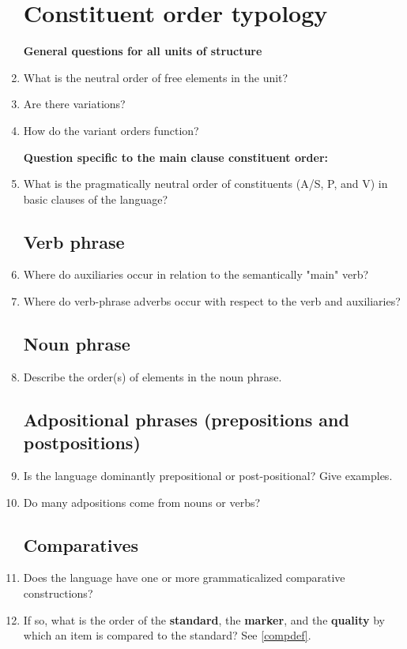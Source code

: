 \documentclass[twocolumn]{scrartcl}
\begin{document}
\begin{enumerate}[resume]
\section{Constituent order typology}
\textbf{General questions for all units of structure}
\item What is the neutral order of free elements in the unit?
\item Are there variations?
\item How do the variant orders function?

\textbf{Question specific to the main clause constituent order:}
\item What is the pragmatically neutral order of constituents (A/S, P, and V) in basic clauses of the language?
\subsection{Verb phrase}
\item Where do auxiliaries occur in relation to the semantically "main" verb?
\item Where do verb-phrase adverbs occur with respect to the verb and auxiliaries?
\subsection{Noun phrase}
\item Describe the order(s) of elements in the noun phrase.
\subsection{Adpositional phrases (prepositions and postpositions)}
\item Is the language dominantly prepositional or post-positional?  Give examples.
\item Do many adpositions come from nouns or verbs?
\subsection{Comparatives}
\item Does the language have one or more grammaticalized comparative constructions?
\item If so, what is the order of the \textbf{standard}, the \textbf{marker}, and the \textbf{quality} by which an item is compared to the standard?  See \ref{compdef}.
\end{enumerate}
\end{document}
